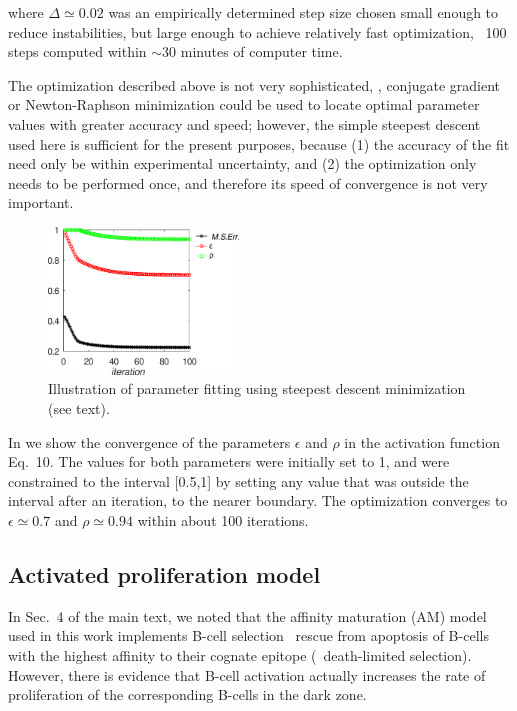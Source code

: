 where $\Delta\simeq 0.02$ was an empirically determined step size
chosen small enough to reduce instabilities, but large enough to achieve
relatively fast optimization, \eg~100 steps computed within $\sim$30 minutes of computer time.

The optimization described above is not very sophisticated, \eg,
conjugate gradient or Newton-Raphson minimization could be used to locate
optimal parameter values with greater accuracy and speed; however, the
simple steepest descent used here is sufficient for the present purposes,
because (1) the accuracy of the fit need only be within experimental
uncertainty, and (2) the optimization only needs to be performed once,
and therefore its speed of convergence is not very important.

\begin{figure}[ht!]
\centering
\includegraphics[width=0.45\textwidth]{../figS9/hfit.eps}
\caption{Illustration of parameter fitting using steepest descent minimization (see text).
}
\label{fig:optim}
\end{figure}


In  we show the convergence of the parameters $\epsilon$ and $\rho$ in the activation function Eq.~10.
The values for both parameters were initially set to 1, and were constrained to the interval [0.5,1] by setting
any value that was outside the interval after an iteration, to the nearer boundary.
The optimization converges to $\epsilon\simeq 0.7$ and $\rho\simeq 0.94$ within about 100 iterations.

\vspace{1EM}
\subsection{Activated proliferation model}
\label{sec:apm}
In Sec.~4 of the main text, we noted that the affinity maturation (AM) model used in this work implements
B-cell selection \via~rescue from apoptosis of B-cells with the highest affinity to their cognate epitope
(\aka~death-limited selection\cite{anderson09,zhang10,amitai17}). However, there is evidence that
B-cell activation actually increases the rate of proliferation of the corresponding B-cells in the
dark zone.\cite{gitlin15}

